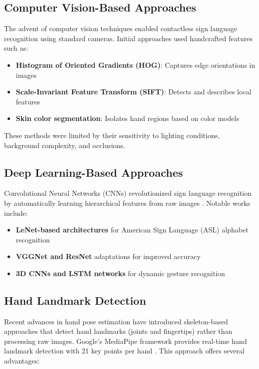 \documentclass[conference]{IEEEtran}
\begin{document}
\subsection{Computer Vision-Based Approaches}

The advent of computer vision techniques enabled contactless sign language recognition using standard cameras. Initial approaches used handcrafted features such as:

\begin{itemize}
    \item \textbf{Histogram of Oriented Gradients (HOG)}: Captures edge orientations in images \cite{dalal2005}
    \item \textbf{Scale-Invariant Feature Transform (SIFT)}: Detects and describes local features \cite{lowe2004}
    \item \textbf{Skin color segmentation}: Isolates hand regions based on color models \cite{phung2005}
\end{itemize}

These methods were limited by their sensitivity to lighting conditions, background complexity, and occlusions.

\subsection{Deep Learning-Based Approaches}

Convolutional Neural Networks (CNNs) revolutionized sign language recognition by automatically learning hierarchical features from raw images \cite{koller2016}. Notable works include:

\begin{itemize}
    \item \textbf{LeNet-based architectures} for American Sign Language (ASL) alphabet recognition \cite{ameen2017}
    \item \textbf{VGGNet and ResNet} adaptations for improved accuracy \cite{huang2018}
    \item \textbf{3D CNNs and LSTM networks} for dynamic gesture recognition \cite{molchanov2016}
\end{itemize}

\subsection{Hand Landmark Detection}

Recent advances in hand pose estimation have introduced skeleton-based approaches that detect hand landmarks (joints and fingertips) rather than processing raw images. Google's MediaPipe framework provides real-time hand landmark detection with 21 key points per hand \cite{zhang2020}. This approach offers several advantages:
\end{document}
